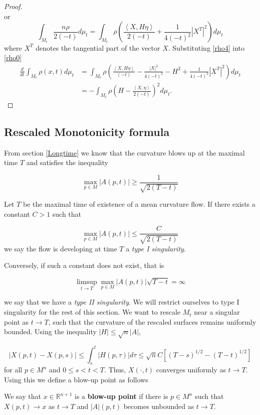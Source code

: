 \begin{proof}
\begin{equation*}
\end{equation*}
or 
\begin{equation}
\int_{M_{t}}\frac{n\rho}{2(-t)} d \mu_{t} = \int_{M_{t}} \rho \left(  \frac{\left< X,H \eta \right>}{2(-t)} + \frac{1}{4(-t)^2}|X^T|^2 \right)d \mu_{t}\label{rho4}
\end{equation}
where $ X^{T} $ denotes the tangential part of the vector $ X $. Substituting \cref{rho4} into \cref{rho0}
\begin{align*}
\frac{d}{dt} \int_{M_{t}}\rho(x,t)d \mu_{t}  &=  \int_{M_{t}}\rho\left(\frac{\left< X,H \eta\right>}{(-t)}- \frac{|X|^{2}}{4(-t)^{2}} -H^{2}+ \frac{1}{4(-t)^2}|X^T|^2\right)d \mu_{t}\\ 
& = -\int_{M_{t}} \rho \left( H - \frac{\left< X, \eta \right>}{2(-t)} \right)^{2} d \mu_{t}.
\end{align*}
\end{proof}

\subsection{Rescaled Monotonicity formula}\label{Type1singularity}

From section \cref{Longtime} we know that the curvature blows up at the maximal time $ T $  and satisfies the inequality

\[ \max_{p \in M}|A(p,t)| \ge \frac{1}{\sqrt{2(T-t)}} \]

\begin{defn}
Let $ T $ be the maximal time of existence of a mean curvature flow. If there exists a constant $ C >1 $ such that 

    \[ \max_{p \in M}|A(p,t)| \le \frac{C}{\sqrt{2(T-t)}} \]
we say the flow is developing at time $ T $ a \textit{type I singularity}.
\end{defn}

Conversely, if such a constant does not exist, that is 

\[ \limsup_{t \to T} \max_{p \in M}|A(p,t)|\sqrt{T-t} = \infty \]

we say that we have a \textit{type II singularity}. We will restrict ourselves to type I singularity for the rest of this section. We want to rescale $M_t$ near a singular point as $t \rightarrow T$, such that the curvature of the rescaled surfaces remains uniformly bounded. Using the inequality $ |H| \le \sqrt{n}|A| $, 

$$
|X(p, t)-X(p, s)| \leq \int_s^t|H(p, \tau)| d \tau \leq \sqrt{n}C\left[(T-s)^{1 / 2}-(T-t)^{1 / 2}\right]
$$
for all $p \in M^n$ and $0 \leq s<t<T$. Thus, $X(\cdot, t)$ converges uniformly as $t \rightarrow T$. Using this we define a blow-up point as follows
\begin{defn}
    We say that $x \in \mathbb{R}^{n+1}$ is a \textbf{blow-up point}  if there is $p \in M^n$ such that $X(p, t) \rightarrow x$ as $t \rightarrow T$ and $|A|(p, t)$ becomes unbounded as $t \rightarrow T$.
\end{defn}

